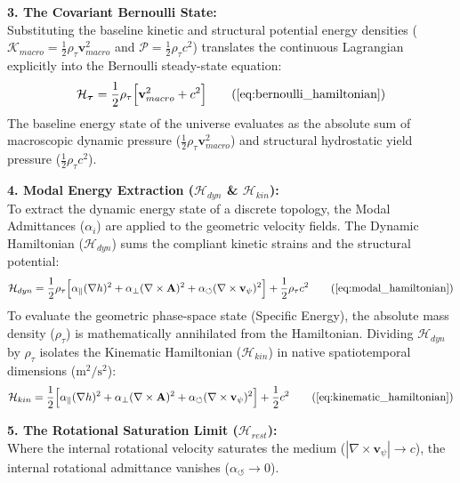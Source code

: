 \documentclass[11pt, a4paper]{article}
\begin{document}
\textbf{3. The Covariant Bernoulli State:} \\
Substituting the baseline kinetic and structural potential energy densities ($\mathcal{K}_{macro} = \frac{1}{2}\rho_{\tau} \mathbf{v}_{macro}^2$ and $\mathcal{P} = \frac{1}{2} \rho_{\tau} c^2$) translates the continuous Lagrangian explicitly into the Bernoulli steady-state equation:
\begin{equation}
    \mathcal{H}_{\boldsymbol{\tau}} = \frac{1}{2} \rho_{\tau} \Big[ \mathbf{v}_{macro}^2 + c^2 \Big] \tag{\ref{eq:bernoulli_hamiltonian}}
\end{equation}
The baseline energy state of the universe evaluates as the absolute sum of macroscopic dynamic pressure ($\frac{1}{2}\rho_{\tau} \mathbf{v}_{macro}^2$) and structural hydrostatic yield pressure ($\frac{1}{2}\rho_{\tau} c^2$).

\textbf{4. Modal Energy Extraction ($\mathcal{H}_{dyn}$ \& $\mathcal{H}_{kin}$):} \\
To extract the dynamic energy state of a discrete topology, the Modal Admittances ($\alpha_{i}$) are applied to the geometric velocity fields. The Dynamic Hamiltonian ($\mathcal{H}_{dyn}$) sums the compliant kinetic strains and the structural potential:
\begin{equation}
    \mathcal{H}_{dyn} = \frac{1}{2} \rho_{\tau} \Big[ \alpha_{\parallel}(\nabla h)^2 + \alpha_{\perp}(\nabla \times \mathbf{A})^2 + \alpha_{\circlearrowleft}(\nabla \times \mathbf{v}_{\psi})^2 \Big] + \frac{1}{2} \rho_{\tau} c^2 \tag{\ref{eq:modal_hamiltonian}}
\end{equation}
To evaluate the geometric phase-space state (Specific Energy), the absolute mass density ($\rho_{\tau}$) is mathematically annihilated from the Hamiltonian. Dividing $\mathcal{H}_{dyn}$ by $\rho_{\tau}$ isolates the Kinematic Hamiltonian ($\mathcal{H}_{kin}$) in native spatiotemporal dimensions ($\text{m}^2/\text{s}^2$):
\begin{equation}
    \mathcal{H}_{kin} = \frac{1}{2} \Big[ \alpha_{\parallel}(\nabla h)^2 + \alpha_{\perp}(\nabla \times \mathbf{A})^2 + \alpha_{\circlearrowleft}(\nabla \times \mathbf{v}_{\psi})^2 \Big] + \frac{1}{2} c^2 \tag{\ref{eq:kinematic_hamiltonian}}
\end{equation}

\textbf{5. The Rotational Saturation Limit ($\mathcal{H}_{rest}$):} \\
Where the internal rotational velocity saturates the medium ($|\nabla \times \mathbf{v}_{\psi}| \to c$), the internal rotational admittance vanishes ($\alpha_{\circlearrowleft} \to 0$).
\end{document}
